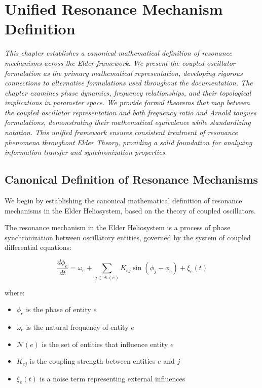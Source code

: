 \chapter{Unified Resonance Mechanism Definition}

\textit{This chapter establishes a canonical mathematical definition of resonance mechanisms across the Elder framework. We present the coupled oscillator formulation as the primary mathematical representation, developing rigorous connections to alternative formulations used throughout the documentation. The chapter examines phase dynamics, frequency relationships, and their topological implications in parameter space. We provide formal theorems that map between the coupled oscillator representation and both frequency ratio and Arnold tongues formulations, demonstrating their mathematical equivalence while standardizing notation. This unified framework ensures consistent treatment of resonance phenomena throughout Elder Theory, providing a solid foundation for analyzing information transfer and synchronization properties.}

\section{Canonical Definition of Resonance Mechanisms}

We begin by establishing the canonical mathematical definition of resonance mechanisms in the Elder Heliosystem, based on the theory of coupled oscillators.

\begin{definition}
The resonance mechanism in the Elder Heliosystem is a process of phase synchronization between oscillatory entities, governed by the system of coupled differential equations:

\begin{equation}
\frac{d\phi_e}{dt} = \omega_e + \sum_{j \in \mathcal{N}(e)} K_{ej} \sin(\phi_j - \phi_e) + \xi_e(t)
\end{equation}

where:
\begin{itemize}
    \item $\phi_e$ is the phase of entity $e$
    \item $\omega_e$ is the natural frequency of entity $e$
    \item $\mathcal{N}(e)$ is the set of entities that influence entity $e$
    \item $K_{ej}$ is the coupling strength between entities $e$ and $j$
    \item $\xi_e(t)$ is a noise term representing external influences
\end{itemize}
\end{definition}


